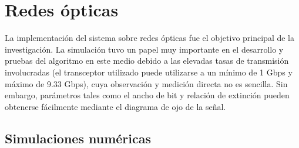 

\section{Redes ópticas}
La implementación del sistema sobre redes ópticas fue el objetivo principal de la investigación.
La simulación tuvo un papel muy importante en el desarrollo y pruebas del algoritmo en este medio debido a las elevadas tasas de transmisión involucradas (el transceptor utilizado puede utilizarse a un mínimo de 1 Gbps y máximo de 9.33 Gbps), cuya observación y medición directa no es sencilla. Sin embargo, parámetros tales como el ancho de bit y relación de extinción pueden obtenerse fácilmente mediante el diagrama de ojo de la señal.

\subsection{Simulaciones numéricas}

